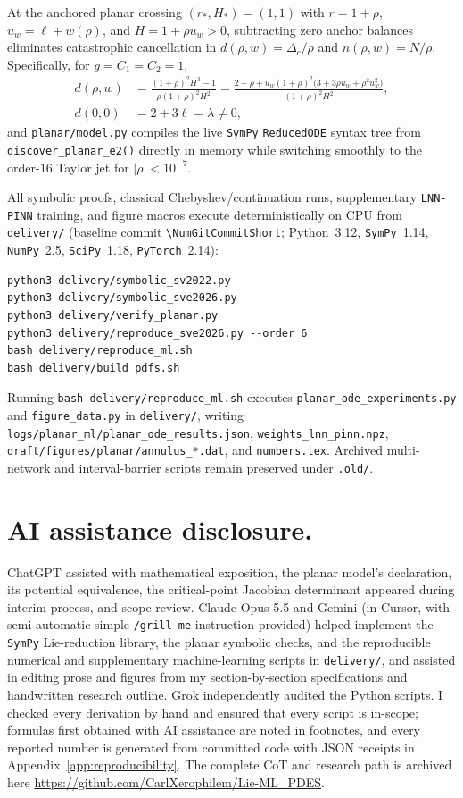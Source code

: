 \documentclass[12pt,a4paper,oneside]{report}
\numberwithin{equation}{chapter}
\theoremstyle{definition}
\theoremstyle{remark}\newtheorem{remark}[theorem]{Remark}
\DeclareRobustCommand{\code}[1]{\nolinkurl{#1}}
\begin{document}
At the anchored planar crossing $(r_*,H_*)=(1,1)$ with $r=1+\rho$, $u_w=\ell+w(\rho)$, and $H=1+\rho u_w>0$, subtracting zero anchor balances eliminates catastrophic cancellation in $d(\rho,w)=\Delta_c/\rho$ and $n(\rho,w)=N/\rho$. Specifically, for $g=C_1=C_2=1$,
\[
 \begin{aligned}
 d(\rho,w)&=\frac{(1+\rho)^2 H^3-1}{\rho(1+\rho)^2 H^2}
 =\frac{2+\rho+u_w(1+\rho)^2\bigl(3+3\rho u_w+\rho^2 u_w^2\bigr)}{(1+\rho)^2 H^2},\\
 d(0,0)&=2+3\ell=\lambda\ne0,
 \end{aligned}
\]
and \code{planar/model.py} compiles the live \texttt{SymPy} \texttt{ReducedODE} syntax tree from \code{discover_planar_e2()} directly in memory while switching smoothly to the order-$16$ Taylor jet for $|\rho|<10^{-7}$.

All symbolic proofs, classical Chebyshev/continuation runs, supplementary \texttt{LNN-PINN} training, and figure macros execute deterministically on CPU from \code{delivery/} (baseline commit \code{\NumGitCommitShort}; Python~3.12, \texttt{SymPy}~1.14, \texttt{NumPy}~2.5, \texttt{SciPy}~1.18, \texttt{PyTorch}~2.14):
\begin{verbatim}
python3 delivery/symbolic_sv2022.py
python3 delivery/symbolic_sve2026.py
python3 delivery/verify_planar.py
python3 delivery/reproduce_sve2026.py --order 6
bash delivery/reproduce_ml.sh
bash delivery/build_pdfs.sh
\end{verbatim}
Running \code{bash delivery/reproduce_ml.sh} executes \code{planar_ode_experiments.py} and \code{figure_data.py} in \code{delivery/}, writing \code{logs/planar_ml/planar_ode_results.json}, \code{weights_lnn_pinn.npz}, \code{draft/figures/planar/annulus_*.dat}, and \code{numbers.tex}. Archived multi-network and interval-barrier scripts remain preserved under \code{.old/}.

\chapter{AI assistance disclosure.}
ChatGPT assisted with mathematical exposition, the planar model's declaration, its potential equivalence, the critical-point Jacobian determinant appeared during interim process, and scope review. Claude Opus 5.5 and Gemini (in Cursor, with semi-automatic simple \texttt{/grill-me} instruction provided) helped implement the \texttt{SymPy} Lie-reduction library, the planar symbolic checks, and the reproducible numerical and supplementary machine-learning scripts in \code{delivery/}, and assisted in editing prose and figures from my section-by-section specifications and handwritten research outline. Grok independently audited the Python scripts. I checked every derivation by hand and ensured that every script is in-scope; formulas first obtained with AI assistance are noted in footnotes, and every reported number is generated from committed code with JSON receipts in Appendix~\ref{app:reproducibility}.
The complete CoT and research path is archived here \url{https://github.com/CarlXerophilem/Lie-ML_PDES}.
\end{document}
